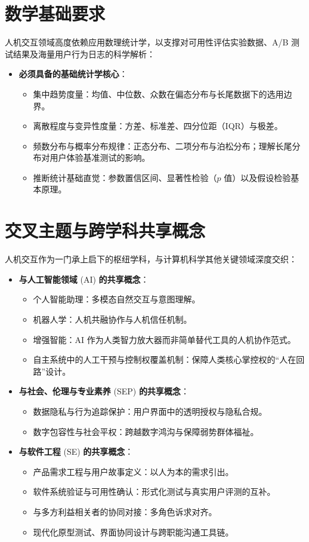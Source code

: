 \section{数学基础要求}

人机交互领域高度依赖应用数理统计学，以支撑对可用性评估实验数据、A/B 测试结果及海量用户行为日志的科学解析：
\begin{itemize}
    \item \textbf{必须具备的基础统计学核心}：
    \begin{itemize}
        \item 集中趋势度量：均值、中位数、众数在偏态分布与长尾数据下的选用边界。
        \item 离散程度与变异性度量：方差、标准差、四分位距（IQR）与极差。
        \item 频数分布与概率分布规律：正态分布、二项分布与泊松分布；理解长尾分布对用户体验基准测试的影响。
        \item 推断统计基础直觉：参数置信区间、显著性检验（$p$ 值）以及假设检验基本原理。
    \end{itemize}
\end{itemize}

\section{交叉主题与跨学科共享概念}

人机交互作为一门承上启下的枢纽学科，与计算机科学其他关键领域深度交织：
\begin{itemize}
    \item \textbf{与人工智能领域} (AI) \textbf{的共享概念}：
    \begin{itemize}
        \item 个人智能助理：多模态自然交互与意图理解。
        \item 机器人学：人机共融协作与人机信任机制。
        \item 增强智能：AI 作为人类智力放大器而非简单替代工具的人机协作范式。
        \item 自主系统中的人工干预与控制权覆盖机制：保障人类核心掌控权的“人在回路”设计。
    \end{itemize}
    \item \textbf{与社会、伦理与专业素养} (SEP) \textbf{的共享概念}：
    \begin{itemize}
        \item 数据隐私与行为追踪保护：用户界面中的透明授权与隐私合规。
        \item 数字包容性与社会平权：跨越数字鸿沟与保障弱势群体福祉。
    \end{itemize}
    \item \textbf{与软件工程} (SE) \textbf{的共享概念}：
    \begin{itemize}
        \item 产品需求工程与用户故事定义：以人为本的需求引出。
        \item 软件系统验证与可用性确认：形式化测试与真实用户评测的互补。
        \item 与多方利益相关者的协同对接：多角色诉求对齐。
        \item 现代化原型测试、界面协同设计与跨职能沟通工具链。
    \end{itemize}
\end{itemize}

